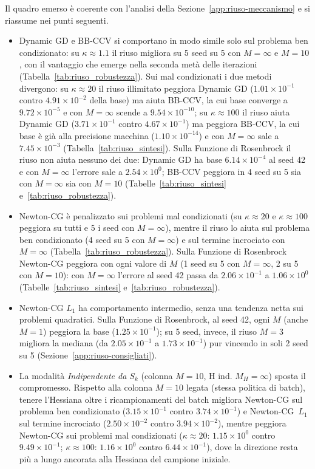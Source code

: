 \documentclass[a4paper,12pt]{article}
\numberwithin{equation}{section}
\numberwithin{figure}{section}
\numberwithin{table}{section}
\begin{document}
Il quadro emerso è coerente con l'analisi della
Sezione~\ref{app:riuso-meccanismo} e si riassume nei punti seguenti.
\begin{itemize}
\item Dynamic GD e BB-CCV si comportano in modo simile solo sul problema
  ben condizionato: su $\kappa \approx 1.1$ il riuso migliora su 5 seed su 5
  con $M=\infty$ e $M=10$, con il vantaggio che emerge nella seconda metà
  delle iterazioni (Tabella~\ref{tab:riuso_robustezza}). Sui mal condizionati i due metodi divergono: su
  $\kappa \approx 20$ il riuso illimitato peggiora Dynamic GD
  ($1.01\times10^{-1}$ contro $4.91\times10^{-2}$ della base) ma aiuta
  BB-CCV, la cui base converge a $9.72\times10^{-5}$ e con $M=\infty$ scende
  a $9.54\times10^{-10}$; su $\kappa \approx 100$ il riuso aiuta Dynamic GD
  ($3.71\times10^{-1}$ contro $4.67\times10^{-1}$) ma peggiora BB-CCV, la
  cui base è già alla precisione macchina ($1.10\times10^{-14}$) e con
  $M=\infty$ sale a $7.45\times10^{-3}$ (Tabella~\ref{tab:riuso_sintesi}).
  Sulla Funzione di Rosenbrock il riuso non aiuta nessuno dei due: Dynamic GD
  ha base $6.14\times10^{-4}$ al seed 42 e con $M=\infty$ l'errore sale a
  $2.54\times10^{0}$; BB-CCV peggiora in 4 seed su 5 sia con $M=\infty$ sia
  con $M=10$ (Tabelle~\ref{tab:riuso_sintesi} e~\ref{tab:riuso_robustezza}).
\item Newton-CG è penalizzato sui problemi mal condizionati
  (su $\kappa\approx20$ e $\kappa\approx100$ peggiora su tutti e 5 i seed con
  $M=\infty$), mentre il riuso lo aiuta sul problema ben condizionato
  (4 seed su 5 con $M=\infty$) e sul termine incrociato con $M=\infty$ (Tabella~\ref{tab:riuso_robustezza}).
  Sulla Funzione di Rosenbrock Newton-CG peggiora con ogni valore di $M$ (1 seed su 5 con
  $M=\infty$, 2 su 5 con $M=10$): con $M=\infty$ l'errore al seed 42 passa da
  $2.06\times10^{-1}$ a $1.06\times10^{0}$ (Tabelle~\ref{tab:riuso_sintesi} e~\ref{tab:riuso_robustezza}).
\item Newton-CG $L_1$ ha comportamento intermedio, senza una tendenza netta
  sui problemi quadratici. Sulla Funzione di Rosenbrock, al seed 42, ogni $M$ (anche
  $M{=}1$) peggiora la base ($1.25\times10^{-1}$); su 5 seed, invece, il riuso
  $M{=}3$ migliora la mediana (da $2.05\times10^{-1}$ a $1.73\times10^{-1}$)
  pur vincendo in soli 2 seed su 5 (Sezione~\ref{app:riuso-consigliati}).
\item La modalità \emph{Indipendente da $S_k$} (colonna $M{=}10$, H ind.
  $M_H{=}\infty$) sposta il compromesso. Rispetto alla colonna $M{=}10$ legata
  (stessa politica di batch), tenere l'Hessiana oltre i ricampionamenti del
  batch migliora Newton-CG sul problema ben condizionato
  ($3.15\times10^{-1}$ contro $3.74\times10^{-1}$) e Newton-CG~$L_1$ sul
  termine incrociato ($2.50\times10^{-2}$ contro $3.94\times10^{-2}$), mentre
  peggiora Newton-CG sui problemi mal condizionati ($\kappa\approx20$:
  $1.15\times10^{0}$ contro $9.49\times10^{-1}$; $\kappa\approx100$:
  $1.16\times10^{0}$ contro $6.44\times10^{-1}$), dove la direzione resta più
  a lungo ancorata alla Hessiana del campione iniziale.
\end{itemize}
\end{document}
